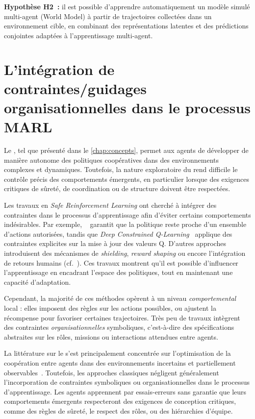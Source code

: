 \medskip

\noindent
\textbf{Hypothèse H2~:} il est possible d'apprendre automatiquement un modèle simulé multi-agent (World Model) à partir de trajectoires collectées dans un environnement cible, en combinant des représentations latentes et des prédictions conjointes adaptées à l'apprentissage multi-agent.


\section{L'intégration de contraintes/guidages organisationnelles dans le processus MARL}

\noindent
Le , tel que présenté dans le \autoref{chap:concepts}, permet aux agents de développer de manière autonome des politiques coopératives dans des environnements complexes et dynamiques. Toutefois, la nature exploratoire du  rend difficile le contrôle précis des comportements émergents, en particulier lorsque des exigences critiques de sûreté, de coordination ou de structure doivent être respectées. 

\medskip

\noindent
Les travaux en \textit{Safe Reinforcement Learning} ont cherché à intégrer des contraintes dans le processus d'apprentissage afin d'éviter certains comportements indésirables. Par exemple, ~\cite{achiam2017constrained} garantit que la politique reste proche d'un ensemble d'actions autorisées, tandis que \textit{Deep Constrained Q-Learning}~\cite{kalweit2020deep} applique des contraintes explicites sur la mise à jour des valeurs Q. D'autres approches introduisent des mécanismes de \textit{shielding}, \textit{reward shaping} ou encore l'intégration de retours humains (cf.~\cite{zhou2025mentor}). Ces travaux montrent qu'il est possible d'influencer l'apprentissage en encadrant l'espace des politiques, tout en maintenant une capacité d'adaptation.

\noindent
Cependant, la majorité de ces méthodes opèrent à un niveau \textit{comportemental} local : elles imposent des règles sur les actions possibles, ou ajustent la récompense pour favoriser certaines trajectoires. Très peu de travaux intègrent des contraintes \textit{organisationnelles} symboliques, c'est-à-dire des spécifications abstraites sur les rôles, missions ou interactions attendues entre agents.

\medskip

\noindent
La littérature sur le  s'est principalement concentrée sur l'optimisation de la coopération entre agents dans des environnements incertains et partiellement observables~\cite{Zhang2021, Papoudakis2021}. Toutefois, les approches classiques négligent généralement l'incorporation de contraintes symboliques ou organisationnelles dans le processus d'apprentissage. Les agents apprennent par essais-erreurs sans garantie que leurs comportements émergents respecteront des exigences de conception critiques, comme des règles de sûreté, le respect des rôles, ou des hiérarchies d'équipe.

